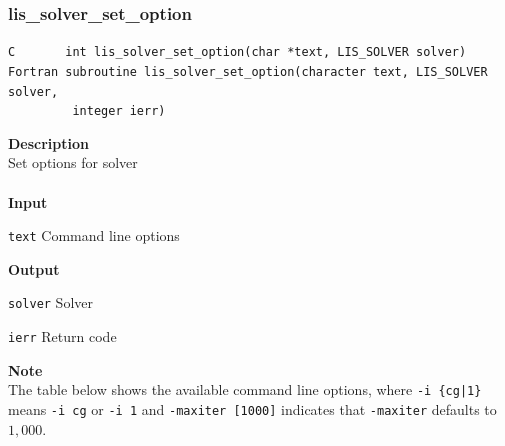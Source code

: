 \documentclass[a4paper]{article}
\newcommand{\namelistlabel}[1]{\mbox{#1}\hfill}
\newenvironment{namelist}[1]{%
 \begin{list}{}
  {\let\makelabel\namelistlabel
  \settowidth{\labelwidth}{#1}
  \setlength{\leftmargin}{1.1\labelwidth}}
}{%
\end{list}}
\begin{document}
  \subsubsection{lis\_solver\_set\_option}
  \label{sec:setoptions}
\begin{screen}
\verb|C       int lis_solver_set_option(char *text, LIS_SOLVER solver)|
\verb|Fortran subroutine lis_solver_set_option(character text, LIS_SOLVER solver,|\\
\verb|         integer ierr)|
\end{screen}
{\bf Description}\\
\indent
Set options for solver
\\ \\
\noindent
{\bf Input}
\begin{namelist}{XXXXXXXXXXXXXXXXXXXX}
\item[\tt text] Command line options
\end{namelist}
{\bf Output}
\begin{namelist}{XXXXXXXXXXXXXXXXXXXX}
\item[\tt solver] Solver
\item[\tt ierr] Return code
\end{namelist}
{\bf Note}\\
\indent
The table below shows the available command line options, 
where \verb=-i {cg|1}= means \verb=-i cg= or \verb=-i 1= and \verb=-maxiter [1000]= indicates 
that \verb=-maxiter= defaults to $1,000$.
\\
\\
\end{document}

